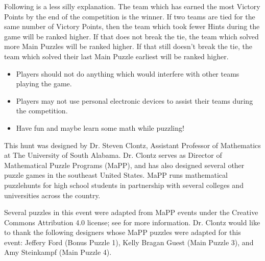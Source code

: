 Following is a less silly explanation.
The team which has earned the most Victory Points by the end of the competition
is the winner. If two teams are tied for the same number of Victory Points,
then the team which took fewer Hints during the game will be ranked higher.
If that does not break the tie, the team which solved more Main Puzzles
will be ranked higher. If that still doesn't break the tie, the team which
solved their last Main Puzzle earliest will be ranked higher.


\begin{itemize}
\item Players should not do anything which would interfere with other teams
      playing the game.
\item Players may not use personal electronic devices to assist their teams
      during the competition.
\item Have fun and maybe learn some math while puzzling!
\end{itemize}


This hunt was designed by Dr. Steven Clontz, Assistant Professor of Mathematics
at The University of South Alabama. 
Dr. Clontz serves as Director of Mathematical Puzzle Programs (MaPP),
and has also designed several other puzzle games in the southeast United States.
MaPP runs mathematical puzzlehunts
for high school students in partnership with several colleges and universities
across the country.

Several puzzles in this event were adapted from MaPP events
under the Creative Commons Attribution 4.0 license; see 
for more information. Dr. Clontz would like to thank the following designers
whose MaPP puzzles were adapted for this event: Jeffery Ford
(Bonus Puzzle 1), Kelly Bragan Guest (Main Puzzle 3), and Amy Steinkampf
(Main Puzzle 4).
